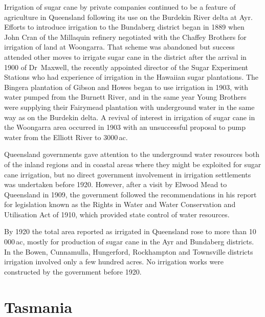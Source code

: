 Irrigation of sugar cane by private companies continued to be a
feature of agriculture in Queensland following its use on the Burdekin
River delta at Ayr.  Efforts to introduce irrigation to the Bundaberg
district began in 1889 when John Cran of the Millaquin refinery
negotiated with the Chaffey Brothers for irrigation of land at
Woongarra.  That scheme
was abandoned but success attended other moves to irrigate sugar cane
in the district after the arrival in 1900 of Dr~Maxwell, the recently
appointed director of the Sugar Experiment Stations who had experience
of irrigation in the Hawaiian sugar plantations.  The Bingera
plantation of Gibson and Howes began to use irrigation in 1903, with
water pumped from the Burnett River, and in the same year Young
Brothers were supplying their Fairymead plantation with underground
water in the same way as on the Burdekin delta.  A revival of interest in irrigation of sugar
cane in the Woongarra area occurred in 1903 with an unsuccessful
proposal to pump water from the Elliott River to
3000\,ac.

Queensland governments gave attention to the underground water
resources both of the inland regions and in coastal areas where they
might be exploited for sugar cane irrigation, but no direct government
involvement in irrigation settlements was undertaken before 1920.
However, after a visit by Elwood Mead to Queensland in 1909, the
government followed the recommendations in his report for legislation
known as the Rights in Water and Water Conservation and Utilisation
Act of 1910, which provided state control of water resources.

By 1920 the total area reported as irrigated in Queensland rose to
more than 10\,000\,ac, mostly for production of sugar cane in the Ayr
and Bundaberg districts.  In the Bowen, Cunnamulla, Hungerford,
Rockhampton and Townsville districts irrigation involved only a few
hundred acres.  No irrigation works were constructed by the
government before 1920.

\section*{Tasmania}

